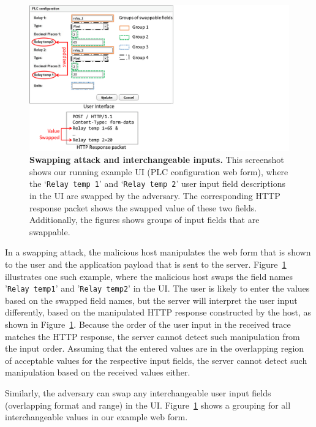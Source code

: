\begin{figure}[t]
  \centering
     \includegraphics[trim={0 -1cm 14cm 0},clip, width=0.65\linewidth]{chapters/IntegriKey/images/SwapExample_revised4.pdf}
    \caption[Swapping attack and interchangeable inputs]{\textbf{Swapping attack and interchangeable inputs.} This screenshot shows our running example UI (PLC configuration web form), where the `\texttt{Relay temp 1}' and `\texttt{Relay temp 2}' user input field descriptions in the UI are swapped by the adversary. The corresponding HTTP response packet shows the swapped value of these two fields. Additionally, the figures shows groups of input fields that are swappable.} 
    \label{fig:swapExample} 
\end{figure}


In a swapping attack, the malicious host manipulates the web form that is shown to the user and the application payload that is sent to the server. Figure~\ref{fig:swapExample} illustrates one such example, where the malicious host swaps the field names '\texttt{Relay temp1}' and '\texttt{Relay temp2}' in the UI. The user is likely to enter the values based on the swapped field names, but the server will interpret the user input differently, based on the manipulated HTTP response constructed by the host, as shown in Figure~\ref{fig:swapExample}. Because the order of the user input in the received trace matches the HTTP response, the server cannot detect such manipulation from the input order. Assuming that the entered values are in the overlapping region of acceptable values for the respective input fields, the server cannot detect such manipulation based on the received values either. 

Similarly, the adversary can swap any interchangeable user input fields (overlapping format and range) in the UI. Figure~\ref{fig:swapExample} shows a grouping for all interchangeable values in our example web form.


